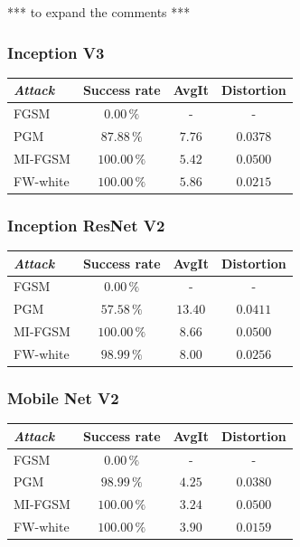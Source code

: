 \documentclass[10pt,twocolumn,letterpaper, english]{article}
\theoremstyle{definition}
\theoremstyle{plain}
\theoremstyle{plain}
\theoremstyle{plain}
\theoremstyle{plain}
\theoremstyle{remark}
\theoremstyle{remark}
\theoremstyle{definition}
\theoremstyle{definition}
\theoremstyle{definition}
\theoremstyle{definition}
\begin{document}
*** to expand the comments *** 

\subsubsection{Inception V3}

\begin{center}
    

\begin{tabular}{ |l|c|c|c| }
 \hline
  \textit{Attack} & Success rate & AvgIt & Distortion \\
 \hline
 
 FGSM   & $0.00\,\%$   &  - & -\\
 PGM&   $87.88\,\%$  & $7.76$  & $0.0378$ \\
 MI-FGSM & $100.00\,\%$ & $5.42$ & $0.0500$\\
 FW-white & $100.00\,\%$ & $5.86$ & $0.0215$\\
\hline
\end{tabular}
\end{center}


\subsubsection{Inception ResNet V2}

\begin{center}
    

\begin{tabular}{ |l|c|c|c| }
 \hline
  \textit{Attack} & Success rate & AvgIt & Distortion \\
 \hline
 
 FGSM   & $0.00\,\%$   &  - & -\\
 PGM&   $57.58\,\%$  & $13.40$  & $0.0411$ \\
 MI-FGSM & $100.00\,\%$ & $8.66$ & $0.0500$\\
 FW-white & $98.99\,\%$ & $8.00$ & $0.0256$\\
\hline
\end{tabular}
\end{center}

\subsubsection{Mobile Net V2}

\begin{center}
    

\begin{tabular}{ |l|c|c|c| }
 \hline
  \textit{Attack} & Success rate & AvgIt & Distortion \\
 \hline
 
 FGSM   & $0.00\,\%$   &  - & -\\
 PGM&   $98.99\,\%$  & $4.25$  & $0.0380$ \\
 MI-FGSM & $100.00\,\%$ & $3.24$ & $0.0500$\\
 FW-white & $100.00\,\%$ & $3.90$ & $0.0159$\\
\hline
\end{tabular}
\end{center}
\end{document}
